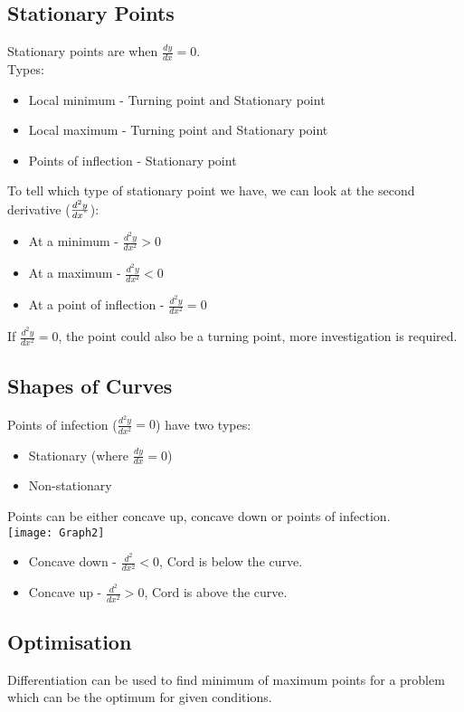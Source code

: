 \documentclass[class=article, crop=false]{standalone}
\begin{document}
\subsection*{Stationary Points}
Stationary points are when $\frac{dy}{dx} = 0$. \\
Types:
\begin{itemize}
	\item Local minimum - Turning point and Stationary point
	\item Local maximum - Turning point and Stationary point
	\item Points of inflection - Stationary point
\end{itemize}
To tell which type of stationary point we have, we can look at the second derivative ($\frac{d^2y}{dx^"}$):
\begin{itemize}
	\item At a minimum - $\frac{d^2y}{dx^2} > 0$
	\item At a maximum - $\frac{d^2y}{dx^2} < 0$
	\item At a point of inflection - $\frac{d^2y}{dx^2} = 0$ 
\end{itemize}
If $\frac{d^2y}{dx^2} = 0$, the point could also be a turning point, more investigation is required. 
\subsection*{Shapes of Curves}
Points of infection ($\frac{d^2y}{dx^2} = 0$) have two types:
\begin{itemize}
	\item Stationary (where $\frac{dy}{dx} = 0$)
	\item Non-stationary
\end{itemize}
Points can be either concave up, concave down or points of infection. \\
\texttt{[image: Graph2]} \\
\begin{itemize}
	\item Concave down - $\frac{d^2}{dx^2} < 0$, Cord is below the curve. 
	\item Concave up - $\frac{d^2}{dx^2} > 0$, Cord is above the curve.   
\end{itemize}
\subsection*{Optimisation}
Differentiation can be used to find minimum of maximum points for a problem which can be the optimum for given conditions. 
\end{document}
